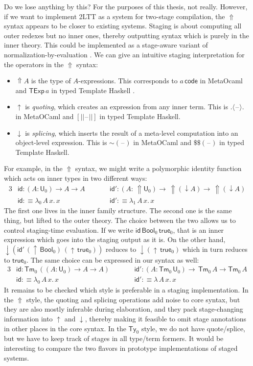 \documentclass[12pt,a4paper,twoside,openany]{book}
\theoremstyle{remark}
\theoremstyle{definition}
\theoremstyle{theorem}
\newcommand{\ms}[1]{\mathsf{#1}}
\newcommand{\id}{\mathsf{id}}
\newcommand{\Tm}{\mathsf{Tm}}
\newcommand{\Ty}{\mathsf{Ty}}
\newcommand{\U}{\mathsf{U}}
\newcommand{\blank}{\mathord{\hspace{1pt}\text{--}\hspace{1pt}}}
\newcommand{\Lift}{\Uparrow}
\newcommand{\Bool}{\ms{Bool}}
\newcommand{\true}{\ms{true}}
\newcommand{\up}{\uparrow}
\newcommand{\down}{\downarrow}
\newcommand{\lab}{\langle}
\newcommand{\rab}{\rangle}
\newcommand{\defn}{:\equiv}
\begin{document}
Do we lose anything by this? For the purposes of this thesis, not
really. However, if we want to implement 2LTT as a system for two-stage
compilation, the $\Lift$ syntax appears to be closer to existing systems.
Staging is about computing all outer redexes but no inner ones, thereby
outputting syntax which is purely in the inner theory. This could be implemented
as a stage-aware variant of normalization-by-evaluation
\cite{abel2013normalization,decidableconv,coqnbe}. We can give an intuitive
staging interpretation for the operators in the $\Lift$ syntax:
\begin{itemize}
\item
  $\Lift\!A$ is the type of $A$-expressions. This corresponds to $a\,\ms{code}$
  in MetaOcaml \cite{kiselyov14metaocaml} and $\ms{TExp}\,a$ in typed Template
  Haskell \cite{typed-th}.
\item
  $\up$ is \emph{quoting}, which creates an expression from any inner term. This is
  $.\lab\blank\rab.$ in MetaOCaml and $[||\blank||]$ in typed Template Haskell.
\item $\down$ is \emph{splicing}, which inserts the result of a meta-level computation into
  an object-level expression. This is $\sim\!(\blank)$ in MetaOCaml and $\$\$(\blank)$ in typed Template Haskell.
\end{itemize}
For example, in the $\Lift$ syntax, we might write a polymorphic identity function
which acts on inner types in two different ways:
\begin{alignat*}{3}
  &\id : (A : \U_0) \to A \to A\hspace{2em} && \id' : (A :\,\Lift\!\U_0) \to\,\Lift\!(\down A) \to\,\Lift\!(\down A)\\
  &\id \defn \lambda_0\,A\,x.\,x && \id' \defn \lambda_1\,A\,x.\,x
\end{alignat*}
The first one lives in the inner family structure. The second one is the same
thing, but lifted to the outer theory. The choice between the two allows us to
control staging-time evaluation. If we write $\id\,\Bool_0\,\true_0$, that is an
inner expression which goes into the staging output as it is. On the other hand,
$\down(\id'\,(\up\,\Bool_0)\,(\up\,\true_0))$ reduces to $\down(\up\,\true_0)$
which in turn reduces to $\true_0$. The same choice can be expressed in our
syntax as well:
\begin{alignat*}{3}
  &\id : \Tm_0\,((A : \U_0) \to A \to A)\hspace{2em}&&\id' : (A : \Tm_0\,\U_0) \to\,\Tm_0\,A \to \Tm_0\,A\\
  &\id \defn \lambda_0\,A\,x.\,x &&\id' \defn \lambda\,A\,x.\,x
\end{alignat*}
It remains to be checked which style is preferable in a staging
implementation. In the $\Lift$ style, the quoting and splicing operations add
noise to core syntax, but they are also mostly inferable during elaboration, and
they pack stage-changing information into $\up$ and $\down$, thereby making it
feasible to omit stage annotations in other places in the core syntax. In the
$\Ty_0$ style, we do not have quote/splice, but we have to keep track of stages
in all type/term formers. It would be interesting to compare the two flavors
in prototype implementations of staged systems.
\end{document}
